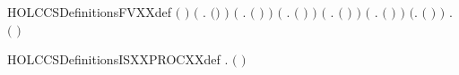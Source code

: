 \begin{SaveVerbatim}{HOLCCSDefinitionsFVXXdef}
\HOLTokenTurnstile{} \ensuremath{(}  \HOLSymConst{\ensuremath{=}} \HOLTokenLeftbrace{}\HOLTokenRightbrace{}\ensuremath{)} \HOLSymConst{\HOLTokenConj{}} \ensuremath{(}\HOLSymConst{\HOLTokenForall{}} .  \ensuremath{(}\HOLSymConst{\ensuremath{\ldotp}}\ensuremath{)} \HOLSymConst{\ensuremath{=}}  \ensuremath{)} \HOLSymConst{\HOLTokenConj{}}
   \ensuremath{(}\HOLSymConst{\HOLTokenForall{}} .  \ensuremath{(} \HOLSymConst{\ensuremath{+}} \ensuremath{)} \HOLSymConst{\ensuremath{=}}   \HOLConst{\HOLTokenUnion{}}  \ensuremath{)} \HOLSymConst{\HOLTokenConj{}}
   \ensuremath{(}\HOLSymConst{\HOLTokenForall{}} .  \ensuremath{(} \HOLSymConst{\ensuremath{\mid}} \ensuremath{)} \HOLSymConst{\ensuremath{=}}   \HOLConst{\HOLTokenUnion{}}  \ensuremath{)} \HOLSymConst{\HOLTokenConj{}}
   \ensuremath{(}\HOLSymConst{\HOLTokenForall{}} .  \ensuremath{(}  \ensuremath{)} \HOLSymConst{\ensuremath{=}}  \ensuremath{)} \HOLSymConst{\HOLTokenConj{}}
   \ensuremath{(}\HOLSymConst{\HOLTokenForall{}} .  \ensuremath{(}  \ensuremath{)} \HOLSymConst{\ensuremath{=}}  \ensuremath{)} \HOLSymConst{\HOLTokenConj{}} \ensuremath{(}\HOLSymConst{\HOLTokenForall{}}.  \ensuremath{(} \ensuremath{)} \HOLSymConst{\ensuremath{=}} \HOLTokenLeftbrace{}\HOLTokenRightbrace{}\ensuremath{)} \HOLSymConst{\HOLTokenConj{}}
   \HOLSymConst{\HOLTokenForall{}} .  \ensuremath{(}  \ensuremath{)} \HOLSymConst{\ensuremath{=}}    
\end{SaveVerbatim}
\newcommand{\HOLCCSDefinitionsFVXXdef}{\UseVerbatim{HOLCCSDefinitionsFVXXdef}}
\begin{SaveVerbatim}{HOLCCSDefinitionsISXXPROCXXdef}
\HOLTokenTurnstile{} \HOLSymConst{\HOLTokenForall{}}.   \HOLSymConst{\HOLTokenEquiv{}} \ensuremath{(}  \HOLSymConst{\ensuremath{=}} \HOLTokenLeftbrace{}\HOLTokenRightbrace{}\ensuremath{)}
\end{SaveVerbatim}
